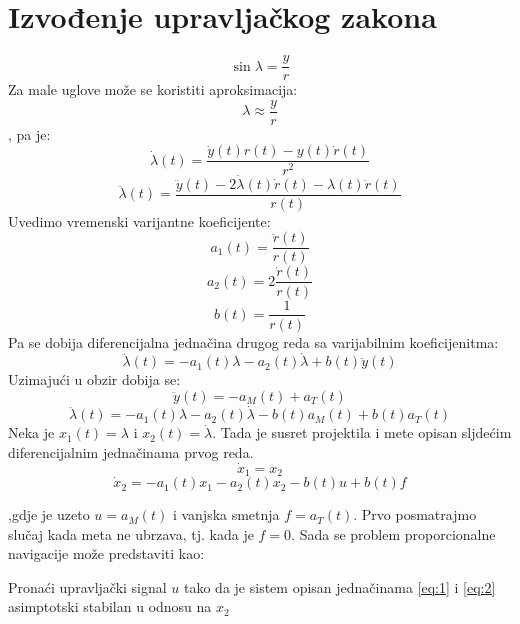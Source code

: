 \section{Izvođenje upravljačkog zakona}
\begin{equation}
    \sin{\lambda}=\frac{y}{r}
\end{equation}
Za male uglove može se koristiti aproksimacija:
\begin{equation}
    \lambda \approx \frac{y}{r}
\end{equation}
, pa je:
\begin{equation}
    \dot{\lambda}(t)=\frac{\dot{y}(t)r(t)-y(t)\dot{r}(t)}{r^2}
\end{equation}
\begin{equation}
    \ddot{\lambda}(t)=\frac{\ddot{y}(t)-2\dot{\lambda}(t)\dot{r}(t)-\lambda(t)\ddot{r}(t)}{r(t)}
\end{equation}
Uvedimo vremenski varijantne koeficijente:
\begin{equation}
    a_1(t)=\frac{\ddot{r}(t)}{r(t)}
\end{equation}
\begin{equation}
    a_2(t)=2\frac{\dot{r}(t)}{r(t)}
\end{equation}
\begin{equation}
    b(t)=\frac{1}{r(t)}
\end{equation}
Pa se dobija diferencijalna jednačina drugog reda sa varijabilnim koeficijenitma:
\begin{equation}
    \ddot{\lambda}(t)=-a_1(t)\lambda-a_2(t)\dot{\lambda}+b(t)\ddot{y}(t)
\end{equation}
Uzimajući u obzir dobija se:
\begin{equation}
    \ddot{y}(t)=-a_M(t)+a_T(t)
\end{equation}
\begin{equation}
    \ddot{\lambda}(t)=-a_1(t)\lambda-a_2(t)\dot{\lambda}-b(t)a_M(t)+b(t)a_T(t)
\end{equation}
Neka je $x_1(t)=\lambda$ i $x_2(t)=\dot{\lambda}$. Tada je susret projektila i mete opisan sljdećim diferencijalnim jednačinama prvog reda.
\begin{equation}
    \dot{x}_1=x_2
    \label{eq:1}
\end{equation}
\begin{equation}
    \dot{x}_2=-a_1(t)x_1-a_2(t)x_2-b(t)u+b(t)f
    \label{eq:2}
\end{equation}

,gdje je uzeto $u=a_M(t)$ i vanjska smetnja $f=a_T(t)$.
Prvo posmatrajmo slučaj kada meta ne ubrzava, tj. kada je $f=0$. Sada se problem proporcionalne navigacije može predstaviti kao:
\begin{tcolorbox}
    Pronaći upravljački signal $u$ tako da je sistem opisan jednačinama \ref{eq:1} i \ref{eq:2} asimptotski stabilan u odnosu na $x_2$
\end{tcolorbox}

